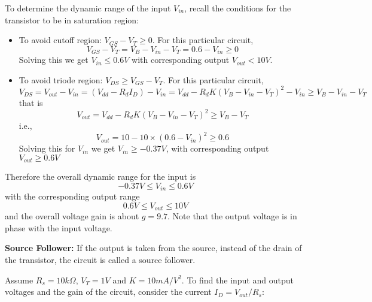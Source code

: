 \documentclass{article}
\begin{document}
To determine the dynamic range of the input $V_{in}$, recall the conditions for the
transistor to be in saturation region:
\begin{itemize}
\item To avoid cutoff region: $V_{GS}-V_T \ge 0$. For this particular circuit, 
  \begin{equation} V_{GS}-V_T=V_B-V_{in}-V_T=0.6-V_{in} \ge 0 \end{equation}
  Solving this we get $V_{in} \le 0.6V$ with corresponding output $V_{out} < 10V$.

\item To avoid triode region: $V_{DS} \ge V_{GS}-V_T$. For this particular circuit, 
\begin{equation}  V_{DS}=V_{out}-V_{in}=(V_{dd}-R_dI_D)-V_{in}
    =V_{dd}-R_dK (V_B-V_{in}-V_T)^2-V_{in} \ge V_B-V_{in}-V_T  \end{equation}
that is
\begin{equation}  V_{out}=V_{dd}-R_dK (V_B-V_{in}-V_T)^2 \ge V_B-V_T \end{equation}
i.e.,
\begin{equation}  V_{out}=10-10\times (0.6-V_{in})^2 \ge 0.6 \end{equation}
Solving this for $V_{in}$ we get $V_{in} \ge -0.37V $, with corresponding output
$V_{out} \ge 0.6V$
\end{itemize}
Therefore the overall dynamic range for the input is 
\begin{equation} -0.37V \le V_{in} \le 0.6V \end{equation}
with the corresponding output range
\begin{equation}  0.6V \le V_{out} \le 10V  \end{equation}
and the overall voltage gain is about $g=9.7$. Note that the output voltage is in
phase with the input voltage.

{\bf Source Follower: } If the output is taken from the source, instead of the 
drain of the transistor, the circuit is called a source follower. 


Assume $R_s=10 k\Omega$, $V_T=1V$ and $K=10 mA/V^2$. To find the input and output 
voltages and the gain of the circuit, consider the current $I_D=V_{out}/R_s$:
\end{document}
